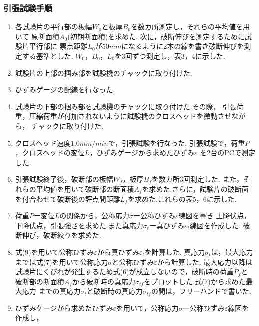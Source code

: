 \documentclass[10pt，a4j]{jsarticle}
\begin{document}
  \subsubsection{引張試験手順}
  \begin{enumerate}
    \item 各試験片の平行部の板幅$W_{0}$と板厚$B_{0}$を数カ所測定し，それらの平均値を用いて
    原断面積$A_{0}$(初期断面積)を求めた.
    次に，破断伸びを測定するために試験片平行部に
    票点距離$L_{0}$が$50mm$になるように2本の線を書き破断伸びを測定する基準とした.
    $W_{0}$，$B_{0}$，$L_{0}$を3回ずつ測定し，表3，4に示した.\\
    \item 試験片の上部の掴み部を試験機のチャックに取り付けた. \\
    \item ひずみゲージの配線を行なった. \\
    \item 試験片の下部の掴み部を試験機のチャックに取り付けた.その際，
    引張荷重，圧縮荷重が付加されないように試験機のクロスヘッドを微動させながら，
    チャックに取り付けた. \\
    \item クロスヘッド速度$1.0mm/min$で，引張試験を行なった.
    引張試験で，荷重$P$，クロスヘッドの変位$L$，ひずみゲージから求めたひずみ$ε$
    を2台のPCで測定した. \\
    \item 引張試験終了後，破断部の板幅$W_{f}$，板厚$B_{f}$を数カ所3回測定した.
    また，それらの平均値を用いて破断部の断面積$A_{f}$を求めた.さらに，試験片の破断面
    を付合わせて破断後の評点間距離$L_{f}$を求めた.これらの表5，6に示した. \\
    \item 荷重$P$ー変位$L$の関係から，公称応力$σ$ー公称ひずみ$ε$線図を書き
    上降伏点，下降伏点，引張強さを求めた.また真応力$σ_{t}$ー真ひずみ$ε_{t}$線図を作成した.
    破断伸び，破断絞りを求めた.\\
    \item 式(9)を用いて公称ひずみ$ε$から真ひずみ$ε_{t}$を計算した.
    真応力$σ_{t}$は，最大応力までは式(7)を用いて公称応力$σ$と公称ひずみ$ε$から計算した.
    最大応力以降は試験片にくびれが発生するため式(6)が成立しないので，破断時の荷重$P_{f}$と
    破断部の断面積$A_{f}$から破断時の真応力$σ_{tf}$をプロットした.式(7)から求めた最大応力
    までの真応力$σ_{t}$と破断時の真応力$σ_{tf}$の間は，フリーハンドで書いた.\\
    \item ひずみケージから求めたひずみ$ε$を用いて，公称応力$σ$ー公称ひずみ$ε$線図を作成し，

\end{enumerate}
\end{document}
